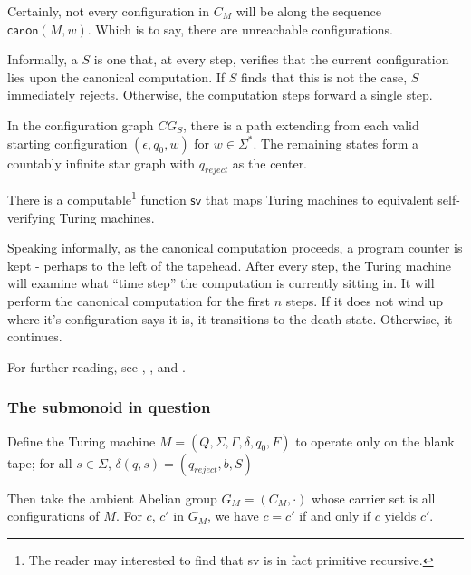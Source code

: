 \documentclass[11pt, titlepage]{article}
\begin{document}
Certainly, not every configuration in $C_M$ will be along the sequence
$\textsf{canon}(M,w)$. Which is to say, there are unreachable
configurations.

Informally, a  $S$ is one that, at
every step, verifies that the current configuration lies upon the
canonical computation. If $S$ finds that this is not the case, $S$
immediately rejects. Otherwise, the computation steps forward a single
step.

In the configuration graph $CG_S$, there is a path extending from each
valid starting configuration $(\epsilon, q_0, w)$ for
$w \in \Sigma^*$. The remaining states form a countably infinite star
graph with $q_{reject}$ as the center.

\begin{proposition}
  There is a computable\footnote{The reader may interested to find
    that \textsf{sv} is in fact primitive recursive.} function
  $\textsf{sv}$ that maps Turing machines to equivalent self-verifying
  Turing machines.
\end{proposition}

Speaking informally, as the canonical computation proceeds, a program
counter is kept - perhaps to the left of the tapehead. After every
step, the Turing machine will examine what ``time step'' the
computation is currently sitting in. It will perform the canonical
computation for the first $n$ steps. If it does not wind up where it's
configuration says it is, it transitions to the death
state. Otherwise, it continues.


For further reading, see \cite{davis:note_utm}, \cite{davis:defn_utm},
and \cite{shepherdson:machine_config}.


\subsubsection*{The submonoid in question}
Define the Turing machine $M = (Q, \Sigma, \Gamma, \delta, q_0, F)$ to
operate only on the blank tape; for all $s \in \Sigma$,
$\delta(q, s) = (q_{reject}, b, S)$


Then take the ambient Abelian group $G_M = (C_M, \cdot)$ whose carrier
set is all configurations of $M$. For $c$, $c'$ in $G_M$, we have
$c = c'$ if and only if $c$ yields $c'$.
\end{document}
